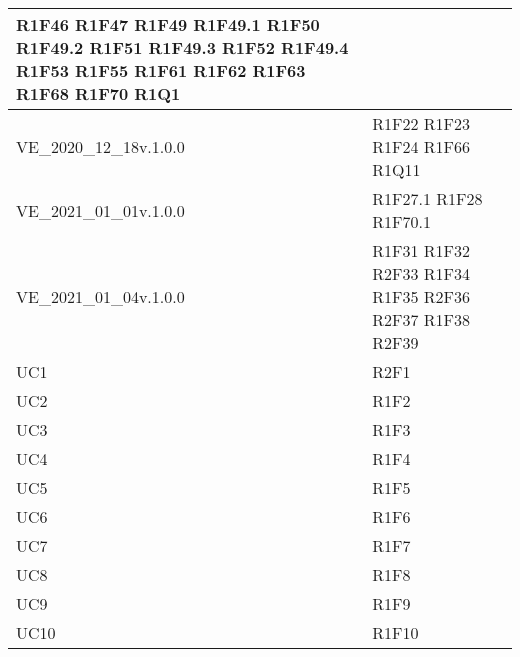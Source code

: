 \begin{center}
\begin{longtable}{|p{44mm}|p{22mm}|}
R1F46 \newline
R1F47 \newline
R1F49 \newline
R1F49.1 \newline
R1F50 \newline
R1F49.2 \newline
R1F51 \newline
R1F49.3 \newline
R1F52 \newline
R1F49.4 \newline
R1F53 \newline
R1F55 \newline
R1F61 \newline
R1F62 \newline
R1F63 \newline
R1F68 \newline
R1F70 \newline
R1Q1 
\\
\hline
VE\_2020\_12\_18v.1.0.0 &
R1F22 \newline
R1F23 \newline
R1F24 \newline
R1F66 \newline
R1Q11 
\\
\hline
VE\_2021\_01\_01v.1.0.0 &
R1F27.1 \newline
R1F28 \newline
R1F70.1 
\\
\hline
VE\_2021\_01\_04v.1.0.0 &
R1F31 \newline
R1F32 \newline
R2F33 \newline
R1F34 \newline
R1F35 \newline
R2F36 \newline
R2F37 \newline
R1F38 \newline
R2F39 
\\
\hline
UC1 &
R2F1 
\\
\hline
UC2 &
R1F2 
\\
\hline
UC3 &
R1F3 
\\
\hline
UC4 &
R1F4 
\\
\hline
UC5 &
R1F5 
\\
\hline
UC6 &
R1F6 
\\
\hline
UC7 &
R1F7 
\\
\hline
UC8 &
R1F8 
\\
\hline
UC9 &
R1F9 
\\
\hline
UC10 &
R1F10 
\\

\end{longtable}
\end{center}
